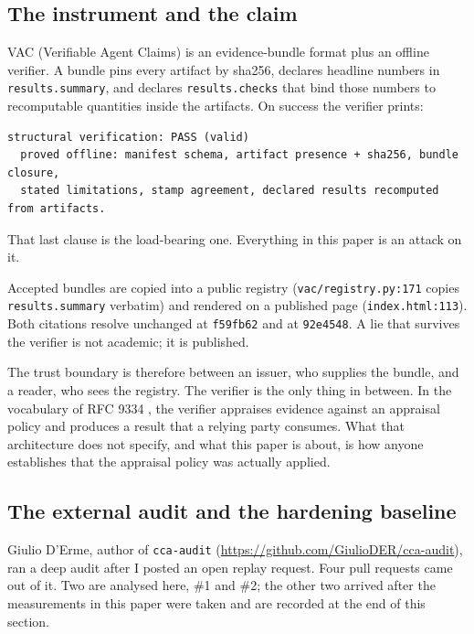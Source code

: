 \documentclass[11pt]{article}
\newcommand{\vacname}{VAC}
\begin{document}
\subsection{The instrument and the claim}

\vacname{} (Verifiable Agent Claims) is an evidence-bundle format plus an offline verifier.
A bundle pins every artifact by sha256, declares headline numbers in
\texttt{results.summary}, and declares \texttt{results.checks} that bind those numbers to
recomputable quantities inside the artifacts. On success the verifier prints:

\begin{Verbatim}[frame=single,fontsize=\small]
structural verification: PASS (valid)
  proved offline: manifest schema, artifact presence + sha256, bundle closure,
  stated limitations, stamp agreement, declared results recomputed from artifacts.
\end{Verbatim}

That last clause is the load-bearing one. Everything in this paper is an attack on it.

Accepted bundles are copied into a public registry (\texttt{vac/registry.py:171} copies
\texttt{results.summary} verbatim) and rendered on a published page
(\texttt{index.html:113}). Both citations resolve unchanged at \texttt{f59fb62} and at
\texttt{92e4548}. A lie that survives the verifier is not academic; it is published.

The trust boundary is therefore between an issuer, who supplies the bundle, and a reader,
who sees the registry. The verifier is the only thing in between. In the vocabulary of
RFC 9334 \citep{birkholz2023rats}, the verifier appraises evidence against an appraisal
policy and produces a result that a relying party consumes. What that architecture does not
specify, and what this paper is about, is how anyone establishes that the appraisal policy
was actually applied.

\subsection{The external audit and the hardening baseline}
\label{sec:audit}

Giulio D'Erme, author of \texttt{cca-audit}
(\url{https://github.com/GiulioDER/cca-audit}), ran a deep audit after I posted an open
replay request. Four pull requests came out of it. Two are analysed here, \#1 and \#2; the
other two arrived after the measurements in this paper were taken and are recorded at the
end of this section.
\end{document}
